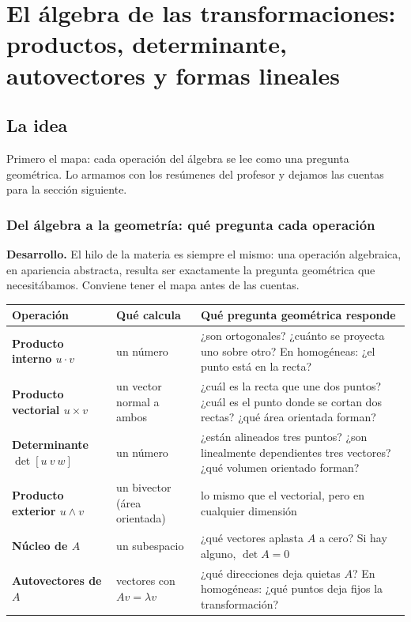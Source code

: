 \chapter{El álgebra de las transformaciones: productos, determinante, autovectores y formas lineales}\label{cap:08}\label{sec:bloque-algebraico}

\section{La idea}

Primero el mapa: cada operación del álgebra se lee como una pregunta geométrica. Lo armamos con los resúmenes del profesor y dejamos las cuentas para la sección siguiente.

\subsection{Del álgebra a la geometría: qué pregunta cada operación}\label{sec:algebra-geometria}

\textbf{Desarrollo.} El hilo de la materia es siempre el mismo: una operación algebraica,
en apariencia abstracta, resulta ser exactamente la pregunta geométrica que necesitábamos.
Conviene tener el mapa antes de las cuentas.

\begin{center}
\begin{tabularx}{\textwidth}{>{\bfseries}p{34mm} X X}
\toprule
Operación & Qué calcula & Qué pregunta geométrica responde\\
\midrule
Producto interno \(u\cdot v\) & un número & ¿son ortogonales? ¿cuánto se proyecta uno
sobre otro? En homogéneas: ¿el punto está en la recta?\\
Producto vectorial \(u\times v\) & un vector normal a ambos & ¿cuál es la recta que une dos
puntos? ¿cuál es el punto donde se cortan dos rectas? ¿qué área orientada forman?\\
Determinante \(\det[u\ v\ w]\) & un número & ¿están alineados tres puntos? ¿son
linealmente dependientes tres vectores? ¿qué volumen orientado forman?\\
Producto exterior \(u\wedge v\) & un bivector (área orientada) & lo mismo que el
vectorial, pero en cualquier dimensión\\
Núcleo de \(A\) & un subespacio & ¿qué vectores aplasta \(A\) a cero? Si hay alguno,
\(\det A=0\)\\
Autovectores de \(A\) & vectores con \(Av=\lambda v\) & ¿qué direcciones deja quietas
\(A\)? En homogéneas: ¿qué puntos deja fijos la transformación?\\
\bottomrule
\end{tabularx}
\end{center}

